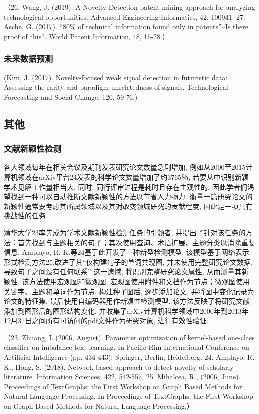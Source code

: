 \documentclass{Style/aas}
\begin{document}
\begin{multicols}{2}
  （26.	Wang, J. (2019). A Novelty Detection patent mining approach for analyzing technological opportunities. Advanced Engineering Informatics, 42, 100941.
  27.	Asche, G. (2017). “80\% of technical information found only in patents”–Is there proof of this?. World Patent Information, 48, 16-28.）

  \subsubsection{未来数据预测}
  (Kim, J. (2017). Novelty-focused weak signal detection in futuristic data: Assessing the rarity and paradigm unrelatedness of signals. Technological Forecasting and Social Change, 120, 59-76.)

  \subsection{其他}
  \subsubsection{文献新颖性检测}
  各大领域每年在相关会议及期刊发表研究论文数量急剧增加, 例如从2000至2015计算机领域在arXiv平台24发表的科学论文数量增加了约3765％, 若要从中识别新颖学术见解工作量相当大. 同时, 同行评审过程是耗时且存在主观性的, 因此学者们渴望找到一种可以自动推断文献新颖性的方法以节省人力物力. 衡量一篇研究论文的新颖性通常要考虑其所属领域以及其对改变领域研究的贡献程度, 因此是一项具有挑战性的任务.

  清华大学23率先成为学术文献新颖性检测任务的引领者, 并提出了针对该任务的方法：首先找到与主题相关的句子；其次使用查询、术语扩展、主题分类以消除重复信息. Amplayo, R. K.等24基于此开发了一种新型检测模型, 该模型基于网络表示形式检测方法25,改进了其“仅构建句子的单词共现图, 并未使用完整研究论文数据, 导致句子之间没有任何联系” 这一遗憾, 将识别完整研究论文属性, 从而测量其新颖性. 该方法使用宏观图和微观图, 宏观图使用附件和文档作为节点；微观图使用关键字、主题和单词作为节点. 构建种子图后, 逐步添加论文, 并将图中变化记录为论文的特征集, 最后使用自编码器用作新颖性检测模型. 该方法反映了将研究文献添加到图形后的图形结构变化, 并收集了arXiv计算机科学领域中2000年到2013年12月31日之间所有可访问的pdf文件作为研究对象, 进行有效性验证.

  （23.	Zhuang, L.(2006, August). Parameter optimization of kernel-based one-class classifier on imbalance text learning. In Pacific Rim International Conference on Artificial Intelligence (pp. 434-443). Springer, Berlin, Heidelberg.
  24.	Amplayo, R. K., Hong, S. (2018). Network-based approach to detect novelty of scholarly literature. Information Sciences, 422, 542-557.
  25.	Mihalcea, R.,  (2006, June). Proceedings of TextGraphs: the First Workshop on Graph Based Methods for Natural Language Processing. In Proceedings of TextGraphs: the First Workshop on Graph Based Methods for Natural Language Processing.）


\end{multicols}
\end{document}
